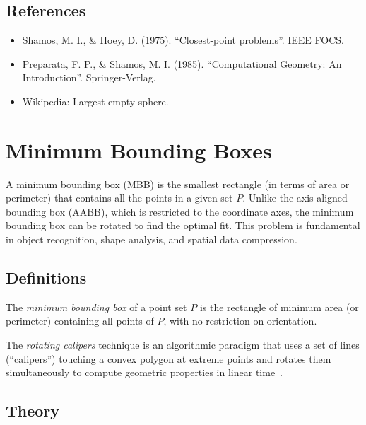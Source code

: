 \subsection{References}

\begin{itemize}
\item Shamos, M. I., \& Hoey, D. (1975). ``Closest-point problems''. IEEE FOCS.
\item Preparata, F. P., \& Shamos, M. I. (1985). ``Computational Geometry: An Introduction''. Springer-Verlag.
\item Wikipedia: Largest empty sphere.
\end{itemize}


\section{Minimum Bounding Boxes}
\label{sec:minimum_bounding_boxes}

A minimum bounding box (MBB) is the smallest rectangle (in terms of area or perimeter) that contains all the points in a given set $P$. Unlike the axis-aligned bounding box (AABB), which is restricted to the coordinate axes, the minimum bounding box can be rotated to find the optimal fit. This problem is fundamental in object recognition, shape analysis, and spatial data compression.

\subsection{Definitions}

\begin{definition}\label{def:mbb}
The \emph{minimum bounding box} of a point set $P$ is the rectangle of minimum area (or perimeter) containing all points of $P$, with no restriction on orientation.
\end{definition}

\begin{definition}\label{def:rotating_calipers}
The \emph{rotating calipers} technique is an algorithmic paradigm that uses a set of lines (``calipers'') touching a convex polygon at extreme points and rotates them simultaneously to compute geometric properties in linear time~\cite{toussaint1983}.
\end{definition}

\subsection{Theory}

